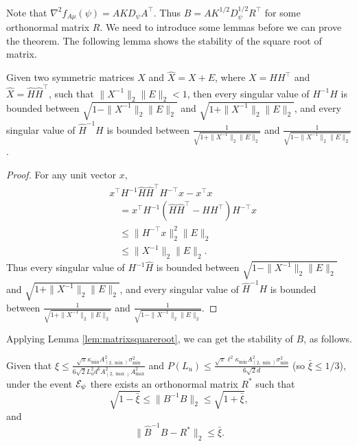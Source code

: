 Note that $\nabla^2f_{A\mu}(\psi) = AKD_{\psi}A^{\top}$. Thus $B = AK^{1/2}D_{\psi}^{1/2}R^{\top}$ for some orthonormal matrix $R$. 
We need to introduce some lemmas before we can prove the theorem. 
The following lemma shows the stability of the square root of matrix.
\begin{lemma}
\label{lem:matrixsquareroot}
Given two symmetric matrices $X$ and $\hat{X} = X + E$, where $X = HH^{\top}$ and $\hat{X} = \hat{H}\hat{H}^{\top}$, such that $\|X^{-1}\|_2 \|E\|_2 < 1$, then every singular value of $H^{-1}\hat{H}$ is bounded between $\sqrt{1- \|X^{-1}\|_2 \|E\|_2}$ and $\sqrt{1+ \|X^{-1}\|_2 \|E\|_2}$, 
and every singular value of $\hat{H}^{-1}H$ is bounded between $\frac{1}{\sqrt{1 + \|X^{-1}\|_2 \|E\|_2}}$ and $\frac{1}{\sqrt{1 - \|X^{-1}\|_2 \|E\|_2}}$. 
\end{lemma}
\begin{proof}
For any unit vector $x$,
\begin{align*}
& x^{\top}H^{-1}\hat{H}\hat{H}^{\top}H^{-\top}x - x^{\top}x\\
& \quad = x^{\top}H^{-1}\left( \hat{H}\hat{H}^{\top} - HH^{\top}\right)H^{-\top}x \\
& \quad \le \|H^{-\top}x\|^2_2 \|E\|_2 \\
& \quad \le \|X^{-1}\|_2 \|E\|_2.
\end{align*}
Thus every singular value of $H^{-1}\hat{H}$ is bounded between $\sqrt{1- \|X^{-1}\|_2 \|E\|_2}$ and $\sqrt{1+ \|X^{-1}\|_2 \|E\|_2}$, 
and every singular value of $\hat{H}^{-1}H$ is bounded between $\frac{1}{\sqrt{1 + \|X^{-1}\|_2 \|E\|_2}}$ and $\frac{1}{\sqrt{1 - \|X^{-1}\|_2 \|E\|_2}}$.
\end{proof}
Applying Lemma \ref{lem:matrixsquareroot}, we can get the stability of $B$, as follows.
\begin{lemma}
\label{lem:BhatinverseB}
Given that $\xi \le \frac{\sqrt{\pi}\kappa_{\min}A^2_{(2,\min)}\sigma_{\min}^2}{6\sqrt{2}L_u^2d^6A_{(2,\max)}^2A_{\max}^2}$ and $P(L_u)\le \frac{\sqrt{\pi}\ell^2\kappa_{\min}A^2_{(2,\min)}\sigma_{\min}^2}{6\sqrt{2}d}$
(so $\bar{\xi} \le 1/3$), under the event $\mathcal{E}_{\psi}$ there exists an orthonormal matrix $R^*$ such that 
 \[
 \sqrt{1-\bar{\xi}} \le \|B^{-1}\hat{B}\|_2 \le \sqrt{1+\bar{\xi}},
 \]
 and
\[
\|\hat{B}^{-1}B - R^*\|_2 \le \bar{\xi}.
\]
\end{lemma}
